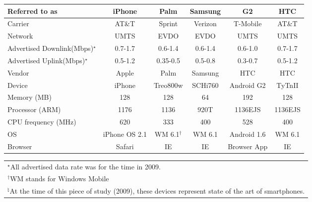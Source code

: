 \begin{table} [!t]
\footnotesize
\begin{center}
\begin{tabular}{|l||c|c|c|c|c|}\hline
Referred to as   & iPhone & Palm        & Samsung          & G2 & HTC \\\hline\hline
Carrier         & AT\&T     & Sprint         & Verizon    & T-Mobile & AT\&T \\\hline
Network         & UMTS      & EVDO           & EVDO       & UMTS     & UMTS \\\hline
Advertised Downlink(Mbps)$^\star$ & 0.7-1.7 & 0.6-1.4      & 0.6-1.4        & 0.6-1.0  & 0.7-1.7 \\\hline
Advertised Uplink(Mbps)$^\star$  & 0.5-1.2 & 0.35-0.5      & 0.5-0.8       & 0.3-0.7  & 0.5-1.2 \\\hline\hline
Vendor          & Apple     & Palm           & Samsung    & HTC      & HTC \\\hline
Device          & iPhone & Treo800w      & SCHi760        & Android G2       & TyTnII \\\hline
Memory (MB)     & 128     & 128          & 64             & 192      & 128 \\\hline
Processor (ARM) & 1176      & 1136  & 920T    & 1136EJS & 1136EJS \\\hline
CPU frequency (MHz) & 620       & 333            & 400    & 528      & 400 \\\hline
OS              & iPhone OS 2.1    & WM 6.1$^\dag$         & WM 6.1        & Android 1.6 & WM 6.1 \\\hline
Browser         & Safari & IE          & IE            & Browser App & IE  \\\hline
\end{tabular}
\label{table:net.device}
\begin{tabular}{l}
\\{\small $^\star$All advertised data rate was for the time in 2009.}
\\{\small $^\dag$WM stands for Windows Mobile}
\\{\small $^\natural$At the time of this piece of study (2009), these devices represent state of the art of smartphones.}
\end{tabular}
\end{center}
\end{table}

